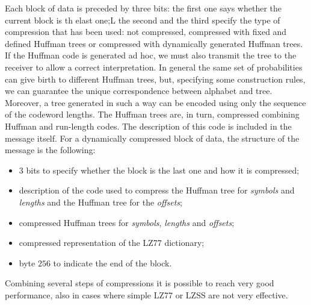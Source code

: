 Each block of data is preceded by three bits: the first one says whether the current block is th elast one;L the second and the third specify the type of compression that has been used: not compressed, compressed with fixed and defined Huffman trees or compressed with dynamically generated Huffman trees. If the Huffman code is generated ad hoc, we must also transmit the tree to the receiver to allow a correct interpretation. In general the same set of probabilities can give birth to different Huffman trees, but, specifying some construction rules, we can guarantee the unique correspondence between alphabet and tree. Moreover, a tree generated in such a way can be encoded using only the sequence of the codeword lengths. The Huffman trees are, in turn, compressed combining Huffman and run-length codes. The description of this code is included in the message itself. For a dynamically compressed block of data, the structure of the message is the following:
\begin{itemize}
\item
3 bits to specify whether the block is the last one and how it is compressed;

\item
description of the code used to compress the Huffman tree for \textit{symbols} and \textit{lengths} and the Huffman tree for the \textit{offsets};

\item
compressed Huffman trees for \textit{symbols}, \textit{lengths} and \textit{offsets};

\item
compressed representation of the LZ77 dictionary;

\item
byte $256$ to indicate the end of the block.
\end{itemize}

Combining several steps of compressions it is possible to reach very good performance, also in cases where simple LZ77 or LZSS are not very effective.


